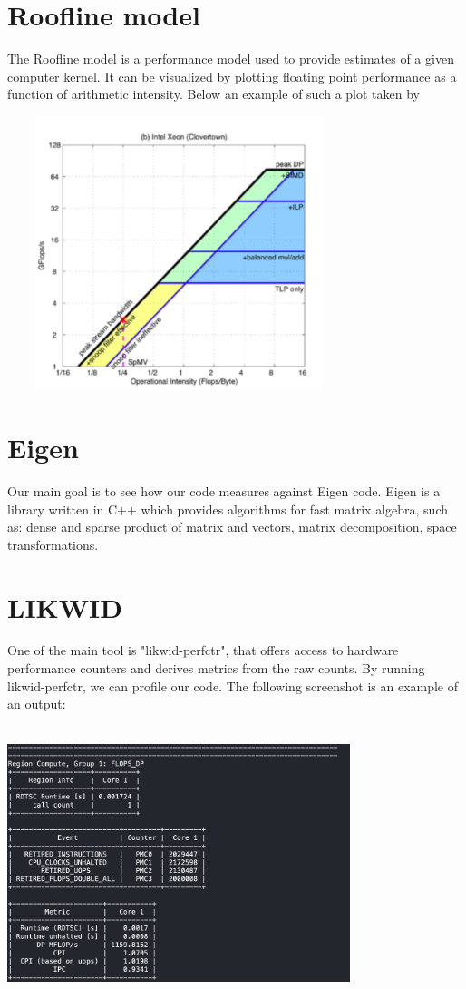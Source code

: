 \documentclass[11pt,a4paper,oneside,titlepage,openright]{book}
\begin{document}
\section{Roofline model}
The Roofline model is a performance model used to provide estimates of a given computer kernel. 
It can be visualized by plotting floating point performance as a function of arithmetic intensity. 
Below an example of such a plot taken by \cite{roofmodel}

\includegraphics[width=10cm, height=8cm]{roof_example}

\section{Eigen}

Our main goal is to see how our code measures against Eigen code. 
Eigen is a library written in C++ which provides algorithms for fast matrix algebra, such as: dense and sparse product of matrix and vectors, matrix decomposition, space transformations. 


\section{LIKWID} 
One of the main tool is "likwid-perfctr", that offers access to hardware performance counters and derives metrics from the raw counts. 
By running likwid-perfctr, we can profile our code. The following screenshot is an example of an output: 

\includegraphics[width=10cm, height=8cm]{scree_lik_perf}
\end{document}
